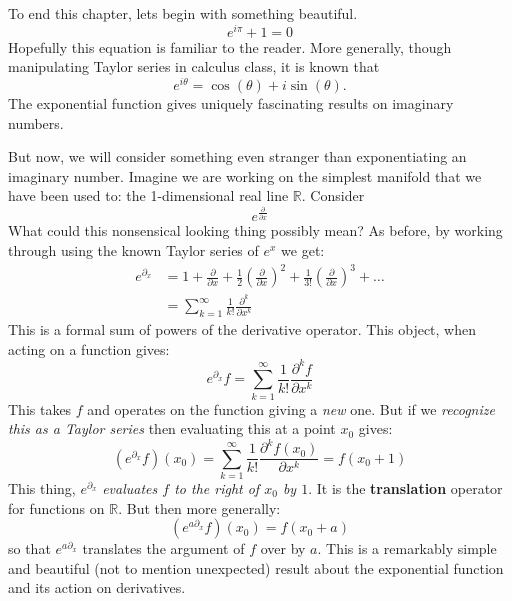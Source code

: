 		To end this chapter, lets begin with something beautiful. 
		\begin{equation*}
			e^{i \pi} + 1 = 0
		\end{equation*}
		Hopefully this equation is familiar to the reader. More generally, though manipulating Taylor series in calculus class, it is known that
		\begin{equation}
			e^{i \theta} = \cos(\theta) + i \sin(\theta).
		\end{equation}
		The exponential function gives uniquely fascinating results on imaginary numbers.
		
		But now, we will consider something even stranger than exponentiating an imaginary number. Imagine we are working on the simplest manifold that we have been used to: the 1-dimensional real line $\mathbb R$. Consider
		\begin{equation*}
			e^{\frac{\partial}{\partial x}}
		\end{equation*}
		What could this nonsensical looking thing possibly mean? As before, by working through using the known Taylor series of $e^x$ we get:
		\begin{align}
			e^{\partial_x} &= 1 + \frac{\partial}{\partial x} + \frac{1}{2} \left( \frac{\partial}{\partial x} \right)^2 + \frac{1}{3!} \left( \frac{\partial}{\partial x} \right)^3 + \dots\\
			&= \sum_{k=1}^\infty \frac{1}{k!} \frac{\partial^k}{\partial x^k}
		\end{align}
		This is a formal sum of powers of the derivative operator. This object, when acting on a function gives:
		\begin{equation}
			e^{\partial_x} f = \sum_{k=1}^\infty \frac{1}{k!} \frac{\partial^k f}{\partial x^k}
		\end{equation} 
		This takes $f$ and operates on the function giving a \emph{new} one. But if we \emph{recognize this as a Taylor series} then evaluating this at a point $x_0$ gives:
		\begin{equation}
			(e^{\partial_x} f)(x_0) = \sum_{k=1}^\infty \frac{1}{k!} \frac{\partial^k f (x_0)}{\partial x^k} = f(x_0 + 1)
		\end{equation}
		This thing, $e^{\partial_x}$ \emph{evaluates $f$ to the right of $x_0$ by $1$}. It is the \textbf{translation} operator for functions on $\mathbb R$. But then more generally: 
		\begin{equation}
			(e^{a \partial_x} f) (x_0) = f(x_0 + a)
		\end{equation}
		so that $e^{a \partial_x}$ translates the argument of $f$ over by $a$. This is a remarkably simple and beautiful (not to mention unexpected) result about the exponential function and its action on derivatives.
		
